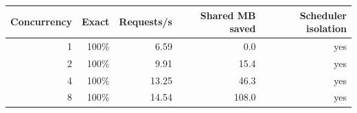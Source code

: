\begin{tabular}{rrrrr}
\toprule
Concurrency & Exact & Requests/s & Shared MB saved & Scheduler isolation \\
\midrule
1 & 100\% & 6.59 & 0.0 & yes \\
2 & 100\% & 9.91 & 15.4 & yes \\
4 & 100\% & 13.25 & 46.3 & yes \\
8 & 100\% & 14.54 & 108.0 & yes \\
\bottomrule
\end{tabular}

